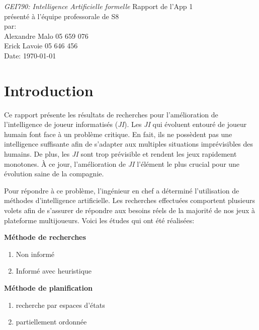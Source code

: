 \documentclass[12pt,english,frenchb,letterpaper]{article}
\begin{document}
\thispagestyle{empty}
\begin{center}
{\large\em GEI790:  Intelligence Artificielle formelle}
\vfill
Rapport de l'App 1\\
présenté à l'équipe professorale de S8\\
\vfill
par:\\
Alexandre Malo\hspace{2cm} 05 659 076\\
Erick Lavoie\hspace{2cm} 05 646 456\\
\vfill
Date: \today
\end{center}

\newpage
\onehalfspacing


\tableofcontents

\newpage


\section{Introduction}
Ce rapport présente les résultats de recherches pour l'amélioration de l'intelligence de joueur informatisés (\textit{JI}).
Les \textit{JI} qui évoluent entouré de joueur humain font face à un problème critique. En fait, ils ne possèdent pas une intelligence suffisante afin de s'adapter aux multiples situations imprévisibles des humains. De plus, les \textit{JI} sont trop prévisible et rendent les jeux rapidement monotones. À ce jour, l'amélioration de \textit{JI} l'élément le plus crucial pour une évolution saine de la compagnie.

Pour répondre à ce problème, l'ingénieur en chef a déterminé l'utilisation de méthodes d'intelligence artificielle. Les recherches effectuées comportent plusieurs volets afin de s'assurer de répondre aux besoins réels de la majorité de nos jeux à plateforme multijoueurs. Voici les études qui ont été réalisées:

\textbf{Méthode de recherches}
\begin{enumerate}
 \item Non informé
 \item Informé avec heuristique
\end{enumerate}

\textbf{Méthode de planification}
\begin{enumerate}
 \item recherche par espaces d'états
 \item partiellement ordonnée
\end{enumerate}
\end{document}
